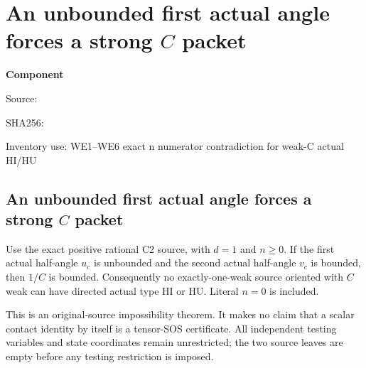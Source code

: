 \chapter{An unbounded first actual angle forces a strong $C$ packet}
\label{component:pb7189b9c1f6e}
\noindent\textbf{Component }\par
{\small\noindent Source: \par}
{\small\noindent SHA256: \par}
{\small\noindent Inventory use: WE1--WE6 exact n numerator contradiction for weak-C actual HI/HU\par}
\medskip
\section[An unbounded first actual angle forces a strong C packet]{An unbounded first actual angle forces a strong $C$ packet}
\label{pb7189b9c1f6e:sec:c2-weak-hi-hu-empty}

\begin{theorem}
Use the exact positive rational C2 source, with $d=1$ and $n\geq0$.
If the first actual half-angle $u_c$ is unbounded and the second
actual half-angle $v_c$ is bounded, then $1/C$ is bounded.
Consequently no exactly-one-weak source oriented with $C$ weak can
have directed actual type HI or HU.  Literal $n=0$ is included.
\end{theorem}

This is an original-source impossibility theorem.  It makes no
claim that a scalar contact identity by itself is a tensor-SOS
certificate.  All independent testing variables and state coordinates
remain unrestricted; the two source leaves are empty before any
testing restriction is imposed.

